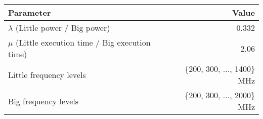 \begin{tabular}{|l|r|}

\hline
{\bf Parameter} & {\bf Value} \\ \hline\hline

$\lambda$ (Little power / Big power) & 0.332 \\\hline
$\mu$ (Little execution time / Big execution time) & 2.06 \\\hline\hline
Little frequency levels & \{200, 300, ..., 1400\} MHz \\\hline
Big frequency levels & \{200, 300, ..., 2000\} MHz \\\hline

\end{tabular}
